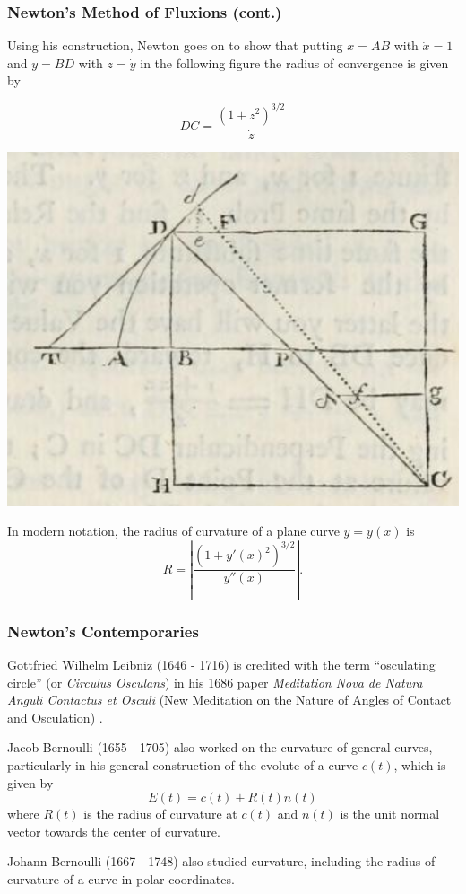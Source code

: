 \documentclass{beamer}
\newcommand{\abs}[1]{\left|#1\right|}
\theoremstyle{definition}
\begin{document}
\begin{frame}
    \frametitle{Newton's Method of Fluxions (cont.)}

    Using his construction, Newton goes on to show that putting $x = AB$ with
    $\dot{x} = 1$ and $y = BD$ with $z = \dot{y}$ in the following figure \cite{newton}
    the radius of convergence is given by
    \begin{minipage}{.49\textwidth}
        \[
            DC = \dfrac{(1+z^2)^{3/2}}{\dot{z}}
        \]
    \end{minipage}
    \begin{minipage}{.49\textwidth}
        \centering
        \includegraphics[width=.8\textwidth]{images/newton-formula-derivation.png}
    \end{minipage}
    In modern notation, the radius of curvature of a plane curve $y = y(x)$ is
    \[
        R = \abs{\frac{(1+y'(x)^2)^{3/2}}{y''(x)}}.
    \]
\end{frame}

\begin{frame}
    \frametitle{Newton's Contemporaries}

    Gottfried Wilhelm Leibniz (1646 - 1716) is credited with the term ``osculating circle''
    (or \emph{Circulus Osculans}) in his 1686 paper \textit{Meditation Nova de Natura Anguli
    Contactus et Osculi} (New Meditation on the Nature of Angles of Contact and Osculation)
    \cite{unsat-hist,geom-diff-view}.

    Jacob Bernoulli (1655 - 1705) also worked on the curvature of general
    curves, particularly in his general construction of the evolute of a curve $c(t)$,
    which is given by
    \[
        E(t) = c(t) + R(t)n(t)
    \]
    where $R(t)$ is the radius of curvature at $c(t)$ and $n(t)$ is the unit normal
    vector towards the center of curvature.

    Johann Bernoulli (1667 - 1748) also studied curvature, including the radius of curvature
    of a curve in polar coordinates.

\end{frame}
\end{document}
